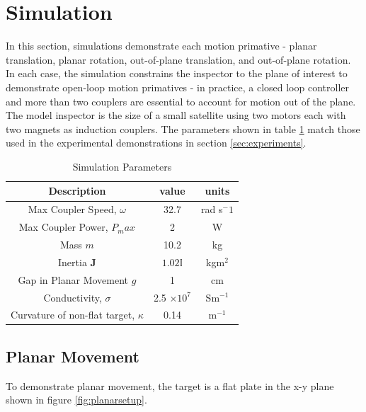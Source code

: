 \documentclass[letterpaper, 10 pt, conference]{ieeeconf}  %
\begin{document}
\section{Simulation}\label{sec:simulations}

In this section, simulations demonstrate each motion primative - planar translation, planar rotation, out-of-plane translation, and out-of-plane rotation. In each case, the simulation constrains the inspector to the plane of interest to demonstrate open-loop motion primatives - in practice, a closed loop controller and more than two couplers are essential to account for motion out of the plane. The model inspector is the size of a small satellite using two motors each with two magnets as induction couplers. The parameters shown in table \ref{table: sim_params} match those used in the experimental demonstrations in section \ref{sec:experiments}.   

\begin{table}[h]
\caption{Simulation Parameters}
\label{table: sim_params}
\begin{center}
\begin{tabular}{| c | c | c |}
\hline
Description & value & units \\
\hline \hline
Max Coupler Speed, $\omega$ & 32.7 & rad s$^-1$ \\ \hline 
Max Coupler Power, $P_max$ & 2 & W \\ \hline

Mass $m$ & 10.2 & kg \\ \hline

Inertia $\textbf{J}$ & $1.02 \mathbb{I}$ & kgm$^2$ \\ \hline

Gap in Planar Movement $g$ & 1 & cm \\ \hline

Conductivity, $\sigma$ & 2.5 $\times 10^7$ & Sm$^{-1}$ \\ \hline

Curvature of non-flat target, $\kappa$  & 0.14 & m$^{-1}$\\

\hline
\end{tabular}
\end{center}
\end{table}

\subsection{Planar Movement}\label{sec:planar_movement_sim}
To demonstrate planar movement, the target is a flat plate in the x-y plane shown in figure \ref{fig:planarsetup}. 
  
\end{document}

